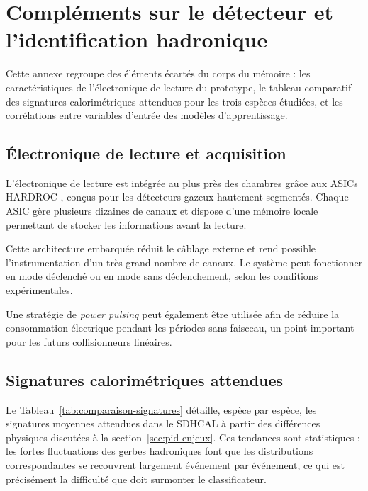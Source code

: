 \chapter{Compléments sur le détecteur et l'identification hadronique}
\label{app:detecteur}

Cette annexe regroupe des éléments écartés du corps du mémoire : les caractéristiques de
l'électronique de lecture du prototype, le tableau comparatif des signatures calorimétriques
attendues pour les trois espèces étudiées, et les corrélations entre variables d'entrée des
modèles d'apprentissage.

\section{Électronique de lecture et acquisition}
\label{app:electronique}

L'électronique de lecture est intégrée au plus près des chambres grâce aux ASICs
\textsc{HARDROC} \cite{dulucq2010hardroc}, conçus pour les détecteurs gazeux hautement segmentés.
Chaque ASIC gère plusieurs dizaines de canaux et dispose d'une mémoire locale permettant de stocker
les informations avant la lecture.

Cette architecture embarquée réduit le câblage externe et rend possible l'instrumentation d'un très
grand nombre de canaux. Le système peut fonctionner en mode déclenché ou en mode sans déclenchement,
selon les conditions expérimentales.

Une stratégie de \emph{power pulsing} peut également être utilisée afin de réduire la consommation
électrique pendant les périodes sans faisceau, un point important pour les futurs collisionneurs
linéaires.

\section{Signatures calorimétriques attendues}
\label{app:signatures}

Le Tableau~\ref{tab:comparaison-signatures} détaille, espèce par espèce, les signatures moyennes
attendues dans le SDHCAL à partir des différences physiques discutées à la
section~\ref{sec:pid-enjeux}. Ces tendances sont statistiques : les fortes fluctuations des gerbes
hadroniques font que les distributions correspondantes se recouvrent largement événement par
événement, ce qui est précisément la difficulté que doit surmonter le classificateur.

